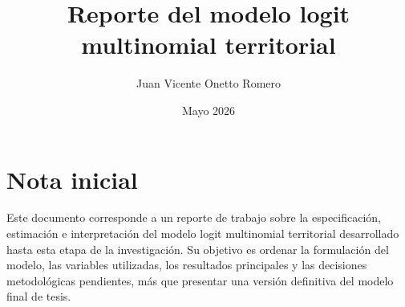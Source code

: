 \documentclass[11pt,letterpaper]{article}
\title{Reporte del modelo logit multinomial territorial}
\author{Juan Vicente Onetto Romero}
\date{Mayo 2026}
\begin{document}
\maketitle

\tableofcontents

\section*{Nota inicial}

Este documento corresponde a un reporte de trabajo sobre la especificación, estimación e
interpretación del modelo logit multinomial territorial desarrollado hasta esta etapa de la
investigación. Su objetivo es ordenar la formulación del modelo, las variables utilizadas, los
resultados principales y las decisiones metodológicas pendientes, más que presentar una versión
definitiva del modelo final de tesis.










\end{document}
